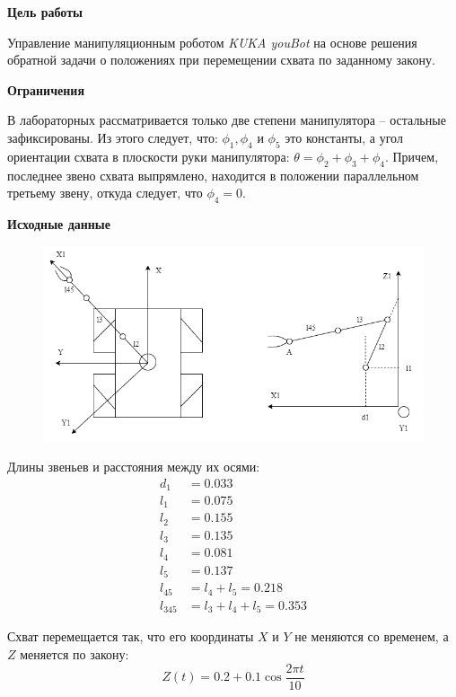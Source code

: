 
\textbf{Цель работы} 

Управление манипуляционным роботом \textit{KUKA youBot} на основе решения обратной задачи о положениях при перемещении схвата по заданному закону.

\textbf{Ограничения}

В лабораторных рассматривается только две степени манипулятора -- остальные зафиксированы. Из этого следует, что: $ \phi_1, \phi_4 $ и $ \phi_5 $ это константы, а угол ориентации схвата в плоскости руки манипулятора: $\theta = \phi_2+\phi_3+\phi_4$. Причем, последнее звено схвата выпрямлено, находится в положении параллельном третьему звену, откуда следует, что $ \phi_4=0 $.

\textbf{Исходные данные}

\begin{figure}[ht!]
    \includegraphics[width=1.0\textwidth]{chapter_intro/figure1.png}
\end{figure}

Длины звеньев и расстояния между их осями:
\begin{align*}
    d_1 &= 0.033 \\
    l_1 &= 0.075 \\
    l_2 &= 0.155 \\
    l_3 &= 0.135 \\
    l_4 &= 0.081 \\
    l_5 &= 0.137 \\
    l_{45} &= l_4+l_5 = 0.218 \\
    l_{345} &= l_3 + l_4 + l_5 = 0.353
\end{align*}

Схват перемещается так, что его координаты $X$ и $Y$ не меняются со временем, а $Z$ меняется по закону:
$$ Z(t) = 0.2 + 0.1 \cos \frac{2 \pi t}{10} $$

